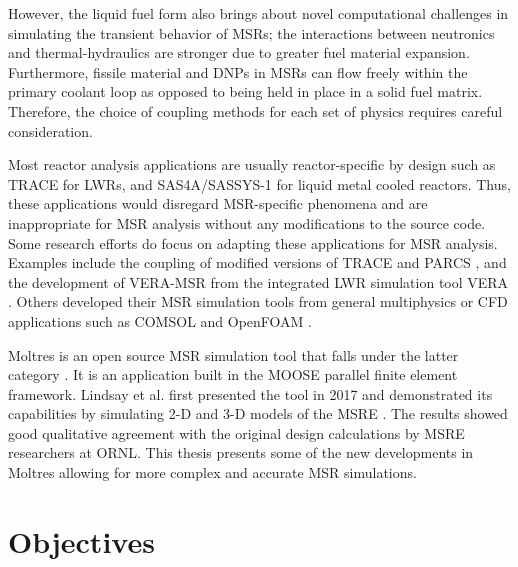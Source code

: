 However, the liquid fuel form also brings about novel computational
challenges in simulating the transient behavior of \glspl{MSR}; the
interactions between neutronics and thermal-hydraulics are stronger due
to greater fuel material expansion. Furthermore, fissile material and
\glspl{DNP} in \glspl{MSR} can flow freely within the primary coolant
loop as opposed to being held in place in a solid fuel matrix. Therefore,
the choice of coupling methods for each set of physics requires careful
consideration. 

Most reactor analysis applications are usually reactor-specific by
design such as TRACE for \glspl{LWR}, and SAS4A/SASSYS-1 for
liquid metal cooled reactors. Thus, these applications would disregard
\gls{MSR}-specific phenomena and are inappropriate for \gls{MSR}
analysis without any modifications to the source code. Some research efforts
do focus on adapting these applications for \gls{MSR} analysis. Examples
include the coupling of modified versions of TRACE and PARCS
\cite{pettersen_coupled_2016}, and the development of VERA-MSR from the
integrated \gls{LWR} simulation tool VERA \cite{graham_development_2019}.
Others developed their \gls{MSR} simulation tools from general
multiphysics or \gls{CFD} applications such as COMSOL
\cite{fiorina_modelling_2014} and OpenFOAM \cite{aufiero_development_2014}.

Moltres is an open source MSR simulation tool that falls under the latter
category \cite{lindsay_introduction_2018}. It is an application built in the
\gls{MOOSE} \cite{gaston_physics-based_2015} parallel finite element
framework. Lindsay et al. first presented the tool in 2017 and demonstrated
its capabilities by simulating 2-D and 3-D models of the \gls{MSRE}
\cite{lindsay_introduction_2018}. The results showed good qualitative
agreement with the original design calculations by \gls{MSRE} researchers at
\gls{ORNL}. This thesis presents some of the new developments in Moltres
allowing for more complex and accurate \gls{MSR} simulations.

\section{Objectives}

